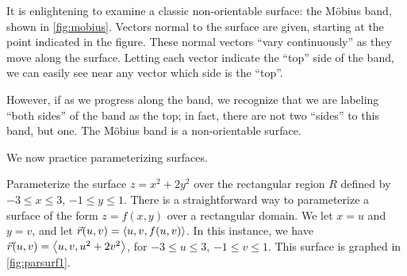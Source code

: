 
It is enlightening to examine a classic non-orientable surface: the Möbius band, shown in \autoref{fig:mobius}. Vectors normal to the surface are given, starting at the point indicated in the figure. These normal vectors ``vary continuously'' as they move along the surface. Letting each vector indicate the ``top'' side of the band, we can easily see near any vector which side is the ``top''.

However, if as we progress along the band, we recognize that we are labeling ``both sides'' of the band as the top; in fact, there are not two ``sides'' to this band, but one. The Möbius band is a non-orientable surface.

We now practice parameterizing surfaces.


\begin{example}\label{ex_parsurf1}%
Parameterize the surface $z=x^2+2y^2$ over the rectangular region $R$ defined by $-3\leq x\leq 3$, $-1\leq y\leq 1$.
\solution
There is a straightforward way to parameterize a surface of the form $z=f(x,y)$ over a rectangular domain. %
We  let $x=u$ and $y=v$, and let $\vec r(u,v) =\left\langle u,v, f(u,v)\right\rangle$. In this instance, we have $\vec r(u,v) =\left\langle u,v,u^2+2v^2\right\rangle$, for $-3\leq u\leq 3$, $-1\leq v\leq 1$. This surface is graphed in \autoref{fig:parsurf1}.
\end{example}

